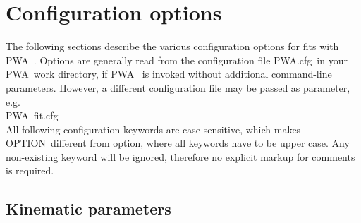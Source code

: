 \documentclass[a4paper,10pt]{article}
\def\PWA{\ttfamily PWA\rmfamily\ }
\def\tt{\ttfamily}
\def\rm{\rmfamily}
\begin{document}
\section{Configuration options}\label{sc_config}

The following sections describe the various configuration options for fits with \PWA.
Options are generally read from the configuration file \tt PWA.cfg\rm\ in your \PWA work directory, if \PWA
is invoked without additional command-line parameters. However, a different configuration file may be passed as parameter,
e.g.\\
\PWA \tt fit.cfg\rm\\
 All following configuration keywords are case-sensitive, which makes
\tt OPTION\rm\ different from \tt option\rm, where all keywords have to  be upper case.
Any non-existing keyword will be ignored, therefore no explicit markup for comments is required.

\subsection{Kinematic parameters}
\end{document}
